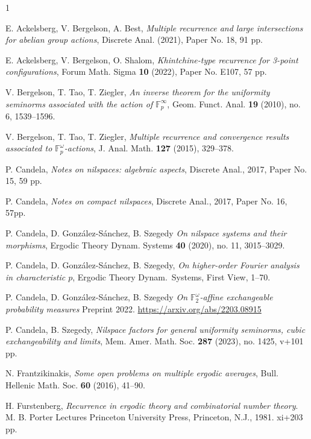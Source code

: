 \documentclass[a4paper,12pt,reqno]{amsart}
\theoremstyle{definition}
\newcommand{\mb}{\mathbb}
\begin{document}
\begin{thebibliography}{1}

 E. Ackelsberg, V. Bergelson, A. Best, \emph{Multiple recurrence and large intersections for abelian group actions}, 
Discrete Anal. (2021), Paper No. 18, 91 pp.

 E. Ackelsberg, V. Bergelson, O. Shalom, \emph{Khintchine-type recurrence for 3-point configurations}, Forum Math. Sigma \textbf{10} (2022), Paper No. E107, 57 pp.

 V. Bergelson, T. Tao, T. Ziegler, \emph{An inverse theorem for the uniformity seminorms associated with the action of $\mb{F}_p^{\infty}$}, Geom. Funct. Anal. \textbf{19} (2010), no. 6, 1539--1596.

 V. Bergelson, T. Tao, T. Ziegler, \emph{Multiple recurrence and convergence results associated to $\mb{F}_p^{\omega}$-actions}, J. Anal. Math. \textbf{127} (2015), 329--378.

 P. Candela, \emph{Notes on nilspaces: algebraic aspects}, Discrete Anal., 2017, Paper No. 15, 59 pp.

 P. Candela, \emph{Notes on compact nilspaces}, Discrete Anal., 2017, Paper No. 16, 57pp.

 P. Candela, D. Gonz\'alez-S\'anchez, B. Szegedy \emph{On nilspace systems and their morphisms}, Ergodic Theory Dynam. Systems \textbf{40} (2020), no. 11, 3015--3029.

 P. Candela, D. Gonz\'alez-S\'anchez, B. Szegedy, \emph{On higher-order Fourier analysis in characteristic $p$}, Ergodic Theory Dynam.\ Systems, First View, 1--70.

 P. Candela, D. Gonz\'alez-S\'anchez,  B. Szegedy \emph{On $\mb{F}_2^\omega$-affine exchangeable probability measures} Preprint 2022. \url{https://arxiv.org/abs/2203.08915}

 P. Candela, B. Szegedy, \emph{Nilspace factors for general uniformity seminorms, cubic exchangeability and limits}, Mem. Amer. Math. Soc. \textbf{287} (2023), no. 1425, v+101 pp.

 N. Frantzikinakis, \emph{Some open problems on multiple ergodic averages}, Bull. Hellenic Math. Soc. \textbf{60}
(2016), 41--90.

 H. Furstenberg, \emph{Recurrence in ergodic theory and combinatorial number theory}. M. B. Porter Lectures 
Princeton University Press, Princeton, N.J., 1981. xi+203 pp.


\end{thebibliography}
\end{document}
